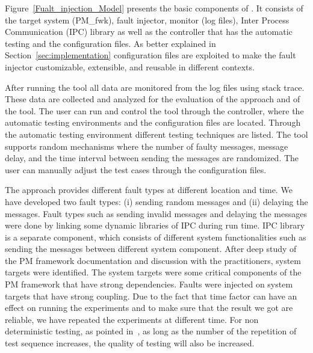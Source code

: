 Figure~\ref{Fualt_injection_Model} presents the basic components of \approach{}. It consists of the target system (PM\_fwk), fault injector, monitor (log files), Inter Process Communication (IPC) library as well as the controller that has the automatic testing and the configuration files.
As better explained in Section~\ref{sec:implementation} configuration files are exploited to make the fault injector customizable, extensible, and reusable in different contexts.

After running the \approach{} tool all data are monitored from the log files using stack trace. These data are collected and analyzed for the evaluation of the approach and of the tool. %
The user can run and control the tool through the controller, where the automatic testing environments and the configuration files are located. Through the automatic testing environment different testing techniques are listed. The \approach{} tool supports random mechanisms where the number of faulty messages, message delay, and the time interval between sending the messages are randomized. The user can manually adjust the test cases through the configuration files.    

The \approach{} approach provides different fault types at different location and time. We have developed two fault types: (i) sending random messages and (ii) delaying the messages. Fault types such as sending invalid messages and delaying the messages were done by linking some dynamic libraries of IPC during run time. IPC library is a separate component, which consists of different system functionalities such as sending the messages between different system component. After deep study of the PM framework documentation and discussion with the practitioners, system targets were identified. The system targets were some critical components of the PM framework that have strong dependencies. Faults were injected on system targets that have strong coupling. Due to the fact that time factor can have an effect on running the experiments and to make sure that the result we got are reliable, we have repeated the experiments at different time. For non deterministic testing, as pointed in~\cite{testselectionnondeterministic}, as long as the number of the repetition of test sequence increases, the quality of testing will also be increased. %

